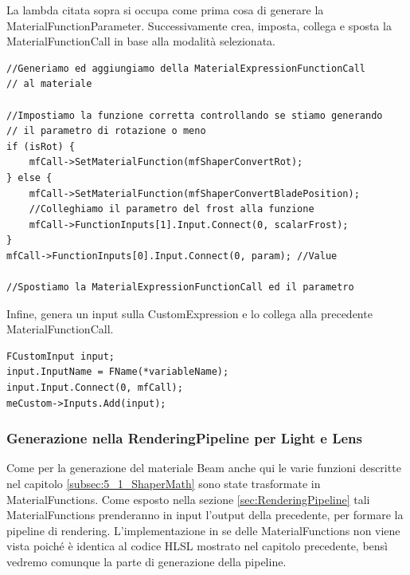 \documentclass[main.tex]{subfiles}
\begin{document}
La lambda citata sopra si occupa come prima cosa di generare la MaterialFunctionParameter.
Successivamente crea, imposta, collega e sposta la MaterialFunctionCall in base alla modalità selezionata.
\begin{lstlisting}
//Generiamo ed aggiungiamo della MaterialExpressionFunctionCall
// al materiale

//Impostiamo la funzione corretta controllando se stiamo generando 
// il parametro di rotazione o meno
if (isRot) {
    mfCall->SetMaterialFunction(mfShaperConvertRot);
} else {
    mfCall->SetMaterialFunction(mfShaperConvertBladePosition);
    //Colleghiamo il parametro del frost alla funzione
    mfCall->FunctionInputs[1].Input.Connect(0, scalarFrost);
}
mfCall->FunctionInputs[0].Input.Connect(0, param); //Value

//Spostiamo la MaterialExpressionFunctionCall ed il parametro
\end{lstlisting}
Infine, genera un input sulla CustomExpression e lo collega alla precedente MaterialFunctionCall.
\begin{lstlisting}
FCustomInput input;
input.InputName = FName(*variableName);
input.Input.Connect(0, mfCall);
meCustom->Inputs.Add(input);
\end{lstlisting}

\subsubsection{Generazione nella RenderingPipeline per Light e Lens}\label{subsec:5_1_ShaperRenderingPipeline}
Come per la generazione del materiale Beam anche qui le varie funzioni descritte nel capitolo \ref{subsec:5_1_ShaperMath} sono state trasformate in MaterialFunctions. Come esposto nella sezione \ref{sec:RenderingPipeline} tali MaterialFunctions prenderanno in input l'output della precedente, per formare la pipeline di rendering. L'implementazione in se delle MaterialFunctions non viene vista poiché è identica al codice HLSL mostrato nel capitolo precedente, bensì vedremo comunque la parte di generazione della pipeline. \newline
\end{document}
